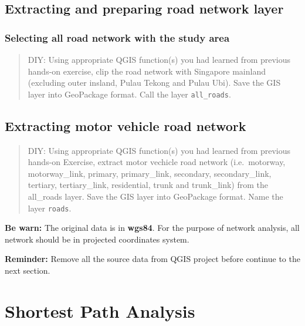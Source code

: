 \documentclass[
  letterpaper,
  DIV=11,
  numbers=noendperiod]{scrreprt}
\begin{document}
\hypertarget{extracting-and-preparing-road-network-layer}{%
\subsection{Extracting and preparing road network
layer}\label{extracting-and-preparing-road-network-layer}}

\hypertarget{selecting-all-road-network-with-the-study-area}{%
\subsubsection{Selecting all road network with the study
area}\label{selecting-all-road-network-with-the-study-area}}

\begin{quote}
DIY: Using appropriate QGIS function(s) you had learned from previous
hands-on exercise, clip the road network with Singapore mainland
(excluding outer insland, Pulau Tekong and Pulau Ubi). Save the GIS
layer into GeoPackage format. Call the layer \texttt{all\_roads}.
\end{quote}

\hypertarget{extracting-motor-vehicle-road-network}{%
\subsection{Extracting motor vehicle road
network}\label{extracting-motor-vehicle-road-network}}

\begin{quote}
DIY: Using appropriate QGIS function(s) you had learned from previous
hands-on Exercise, extract motor vechicle road network (i.e.~motorway,
motorway\_link, primary, primary\_link, secondary, secondary\_link,
tertiary, tertiary\_link, residential, trunk and trunk\_link) from the
all\_roads layer. Save the GIS layer into GeoPackage format. Name the
layer \texttt{roads}.
\end{quote}

\textbf{Be warn:} The original data is in \textbf{wgs84}. For the
purpose of network analysis, all network should be in projected
coordinates system.

\textbf{Reminder:} Remove all the source data from QGIS project before
continue to the next section.

\hypertarget{shortest-path-analysis}{%
\section{Shortest Path Analysis}\label{shortest-path-analysis}}
\end{document}
